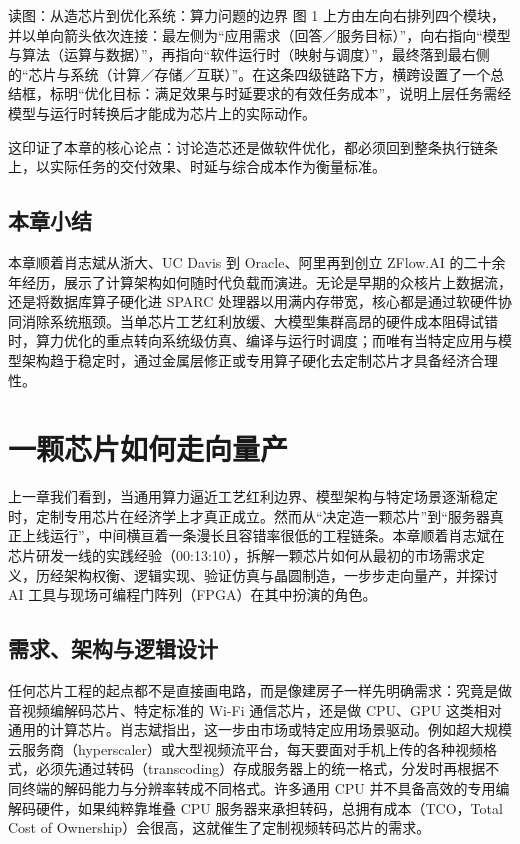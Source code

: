 \documentclass[UTF8,a4paper,11pt,fontset=fandol]{ctexart}
\begin{document}
\begin{knowledgebox}{读图：从造芯片到优化系统：算力问题的边界}
图 1 上方由左向右排列四个模块，并以单向箭头依次连接：最左侧为“应用需求（回答／服务目标）”，向右指向“模型与算法（运算与数据）”，再指向“软件运行时（映射与调度）”，最终落到最右侧的“芯片与系统（计算／存储／互联）”。在这条四级链路下方，横跨设置了一个总结框，标明“优化目标：满足效果与时延要求的有效任务成本”，说明上层任务需经模型与运行时转换后才能成为芯片上的实际动作。
\end{knowledgebox}
这印证了本章的核心论点：讨论造芯还是做软件优化，都必须回到整条执行链条上，以实际任务的交付效果、时延与综合成本作为衡量标准。
\subsection{本章小结}
本章顺着肖志斌从浙大、UC Davis 到 Oracle、阿里再到创立 ZFlow.AI 的二十余年经历，展示了计算架构如何随时代负载而演进。无论是早期的众核片上数据流，还是将数据库算子硬化进 SPARC 处理器以用满内存带宽，核心都是通过软硬件协同消除系统瓶颈。当单芯片工艺红利放缓、大模型集群高昂的硬件成本阻碍试错时，算力优化的重点转向系统级仿真、编译与运行时调度；而唯有当特定应用与模型架构趋于稳定时，通过金属层修正或专用算子硬化去定制芯片才具备经济合理性。
\section{一颗芯片如何走向量产}
上一章我们看到，当通用算力逼近工艺红利边界、模型架构与特定场景逐渐稳定时，定制专用芯片在经济学上才真正成立。然而从“决定造一颗芯片”到“服务器真正上线运行”，中间横亘着一条漫长且容错率很低的工程链条。本章顺着肖志斌在芯片研发一线的实践经验（00:13:10），拆解一颗芯片如何从最初的市场需求定义，历经架构权衡、逻辑实现、验证仿真与晶圆制造，一步步走向量产，并探讨 AI 工具与现场可编程门阵列（FPGA）在其中扮演的角色。
\subsection{需求、架构与逻辑设计}
任何芯片工程的起点都不是直接画电路，而是像建房子一样先明确需求：究竟是做音视频编解码芯片、特定标准的 Wi-Fi 通信芯片，还是做 CPU、GPU 这类相对通用的计算芯片。肖志斌指出，这一步由市场或特定应用场景驱动。例如超大规模云服务商（hyperscaler）或大型视频流平台，每天要面对手机上传的各种视频格式，必须先通过转码（transcoding）存成服务器上的统一格式，分发时再根据不同终端的解码能力与分辨率转成不同格式。许多通用 CPU 并不具备高效的专用编解码硬件，如果纯粹靠堆叠 CPU 服务器来承担转码，总拥有成本（TCO，Total Cost of Ownership）会很高，这就催生了定制视频转码芯片的需求。
\end{document}
